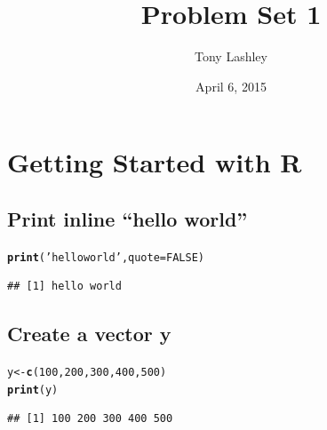 \documentclass{article}\usepackage[]{graphicx}\usepackage[]{color}
\title{Problem Set 1}
\author{Tony Lashley}
\date{April 6, 2015}
\makeatletter
\newcommand{\hlnum}[1]{\textcolor[rgb]{0.686,0.059,0.569}{#1}}%
\newcommand{\hlstr}[1]{\textcolor[rgb]{0.192,0.494,0.8}{#1}}%
\newcommand{\hlstd}[1]{\textcolor[rgb]{0.345,0.345,0.345}{#1}}%
\newcommand{\hlkwb}[1]{\textcolor[rgb]{0.69,0.353,0.396}{#1}}%
\newcommand{\hlkwc}[1]{\textcolor[rgb]{0.333,0.667,0.333}{#1}}%
\newcommand{\hlkwd}[1]{\textcolor[rgb]{0.737,0.353,0.396}{\textbf{#1}}}%
\newenvironment{kframe}{%
 \def\at@end@of@kframe{}%
 \ifinner\ifhmode%
  \def\at@end@of@kframe{\end{minipage}}%
  \begin{minipage}{\columnwidth}%
 \fi\fi%
 \def\FrameCommand##1{\hskip\@totalleftmargin \hskip-\fboxsep
 \colorbox{shadecolor}{##1}\hskip-\fboxsep
     \hskip-\linewidth \hskip-\@totalleftmargin \hskip\columnwidth}%
 \MakeFramed {\advance\hsize-\width
   \@totalleftmargin\z@ \linewidth\hsize
   \@setminipage}}%
 {\par\unskip\endMakeFramed%
 \at@end@of@kframe}
\newenvironment{knitrout}{}{} %
\makeatother
\begin{document}
\maketitle

\section{Getting Started with R}
\subsection{Print inline “hello world”}

\begin{knitrout}
\color{fgcolor}\begin{kframe}
\begin{alltt}
\hlkwd{print}\hlstd{(}\hlstr{'hello world'}\hlstd{,} \hlkwc{quote}\hlstd{=}\hlnum{FALSE}\hlstd{)}
\end{alltt}
\begin{verbatim}
## [1] hello world
\end{verbatim}
\end{kframe}
\end{knitrout}

\subsection{Create a vector y}
\begin{knitrout}
\color{fgcolor}\begin{kframe}
\begin{alltt}
\hlstd{y} \hlkwb{<-} \hlkwd{c}\hlstd{(}\hlnum{100}\hlstd{,}\hlnum{200}\hlstd{,}\hlnum{300}\hlstd{,}\hlnum{400}\hlstd{,}\hlnum{500}\hlstd{)}
\hlkwd{print}\hlstd{(y)}
\end{alltt}
\begin{verbatim}
## [1] 100 200 300 400 500
\end{verbatim}
\end{kframe}
\end{knitrout}
\end{document}
